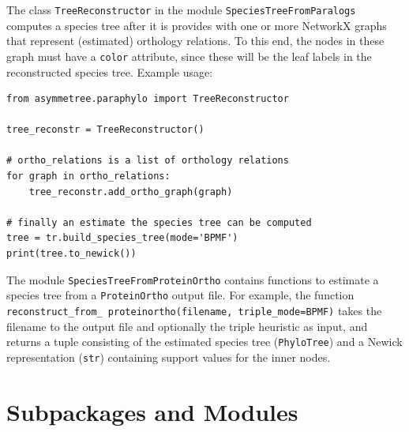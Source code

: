 \documentclass[hidelinks,11pt]{article}
\newcommand{\sq}{\textquotesingle}
\begin{document}
The class \texttt{TreeReconstructor} in the module \texttt{SpeciesTreeFromParalogs} computes a species tree after it is provides with one or more NetworkX graphs that represent (estimated) orthology relations.
To this end, the nodes in these graph must have a \texttt{\sq color\sq}
attribute, since these will be the leaf labels in the reconstructed species
tree.
Example usage:

\begin{adjustwidth}{1cm}{1cm}\vspace{2mm}
\begin{verbatim}
from asymmetree.paraphylo import TreeReconstructor

tree_reconstr = TreeReconstructor()

# ortho_relations is a list of orthology relations
for graph in ortho_relations:
    tree_reconstr.add_ortho_graph(graph)

# finally an estimate the species tree can be computed
tree = tr.build_species_tree(mode='BPMF')
print(tree.to_newick())
\end{verbatim}
\end{adjustwidth}

The module \texttt{SpeciesTreeFromProteinOrtho} contains functions to estimate
a species tree from a \texttt{ProteinOrtho} \citep{lechner2011} output file.
For example, the function \texttt{reconstruct\_from\_ proteinortho(filename,
triple\_mode=\sq BPMF\sq)} takes the filename to the output file and optionally
the triple heuristic as input, and returns a tuple consisting of the estimated
species tree (\texttt{PhyloTree}) and a Newick representation (\texttt{str})
containing support values for the inner nodes.




\newpage


\appendix

\section{Subpackages and Modules}\label{apx:package_structure}
\end{document}
